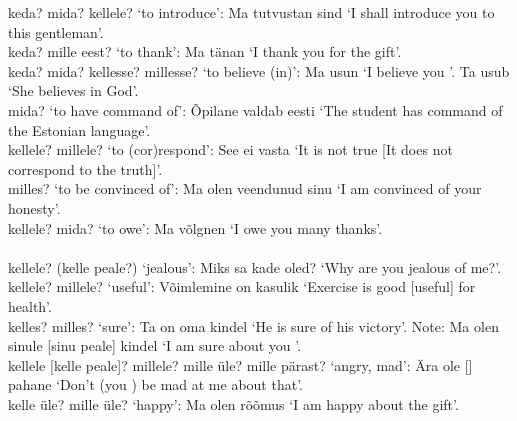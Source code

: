  keda? mida? kellele? `to introduce': Ma tutvustan sind  `I shall introduce you to this gentleman'. \\

 keda? mille eest? `to thank': Ma tänan  `I thank you \pl for the gift'. \\

 keda? mida? kellesse? millesse? `to believe (in)': Ma usun  `I believe you \sing'. Ta usub  `She believes in God'. \\

 mida? `to have command of': Õpilane valdab eesti  `The student has command of the Estonian language'. \\

 kellele? millele? `to (cor)respond': See ei vasta  `It is not true [It does not correspond to the truth]'. \\

 milles? `to be convinced of': Ma olen veendunud sinu  `I am convinced of your \sing honesty'. \\

 kellele? mida? `to owe': Ma võlgnen  `I owe you \sing many thanks'. \\

\newSection  \label{section-405}  \\

 kellele? (kelle peale?) `jealous': Miks sa  kade oled? `Why are you \sing jealous of me?'.\\

 kellele? millele? `useful': Võimlemine on  kasulik `Exercise is good [useful] for health'. \\

 kelles? milles? `sure': Ta on oma  kindel `He is sure of his victory'. Note: Ma olen sinule [sinu peale] kindel `I am sure about you \sing'. \\

 kellele [kelle peale]? millele? mille üle? mille pärast? `angry, mad': Ära ole  []  pahane `Don't (you \sing) be mad at me about that'. \\

 kelle üle? mille üle? `happy': Ma olen rõõmus  `I am happy about the gift'. \\

